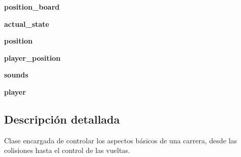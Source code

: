 \begin{DoxyCompactItemize}
\item 
\hypertarget{classengine_1_1gamecontrol_1_1GameControl_ad5d63e1e5b4bc1edf49cf8999c142d4e}{
{\bfseries position\-\_\-board}}
\label{classengine_1_1gamecontrol_1_1GameControl_ad5d63e1e5b4bc1edf49cf8999c142d4e}

\item 
\hypertarget{classengine_1_1gamecontrol_1_1GameControl_a08260c17d05c420c4ff903255325e245}{
{\bfseries actual\-\_\-state}}
\label{classengine_1_1gamecontrol_1_1GameControl_a08260c17d05c420c4ff903255325e245}

\item 
\hypertarget{classengine_1_1gamecontrol_1_1GameControl_a49e8093a7a9ef1251eddab2f63325bba}{
{\bfseries position}}
\label{classengine_1_1gamecontrol_1_1GameControl_a49e8093a7a9ef1251eddab2f63325bba}

\item 
\hypertarget{classengine_1_1gamecontrol_1_1GameControl_a6c0392aa61e7fc96d6dd383f38863f2d}{
{\bfseries player\-\_\-position}}
\label{classengine_1_1gamecontrol_1_1GameControl_a6c0392aa61e7fc96d6dd383f38863f2d}

\item 
\hypertarget{classengine_1_1gamecontrol_1_1GameControl_a85730118d25fb97276b9253496578ea5}{
{\bfseries sounds}}
\label{classengine_1_1gamecontrol_1_1GameControl_a85730118d25fb97276b9253496578ea5}

\item 
\hypertarget{classengine_1_1gamecontrol_1_1GameControl_abb3e7f632f467c079f4d34679dc324eb}{
{\bfseries player}}
\label{classengine_1_1gamecontrol_1_1GameControl_abb3e7f632f467c079f4d34679dc324eb}

\end{DoxyCompactItemize}


\subsection{\-Descripción detallada}
\-Clase encargada de controlar los aspectos básicos de una carrera, desde las colisiones hasta el control de las vueltas. 

